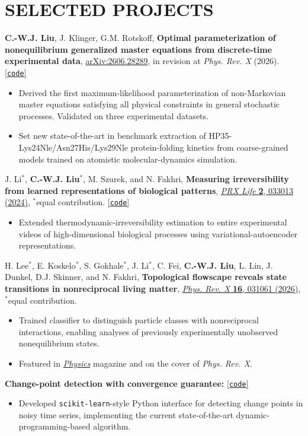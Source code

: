 \documentclass[11pt,letterpaper]{article}
\newcommand{\publication}[1]{#1\par}
\newcommand{\projectsep}{\par\vspace{2pt}}
\begin{document}
\section{SELECTED PROJECTS}
\publication{\textbf{C.-W.J. Liu}, J. Klinger, G.M. Rotskoff, \textbf{Optimal parameterization of nonequilibrium generalized master equations from discrete-time experimental data}, \href{https://doi.org/10.48550/arXiv.2606.28289}{arXiv:2606.28289}, in revision at \textit{Phys. Rev. X} (2026). \href{https://github.com/rotskoff-group/GMEx}{[\texttt{code}]}}
\begin{itemize}
\item Derived the first maximum-likelihood parameterization of non-Markovian master equations satisfying all physical constraints in general stochastic processes.
Validated on three experimental datasets.
\item Set new state-of-the-art in benchmark extraction of HP35-Lys24Nle/Asn27His/Lys29Nle protein-folding kinetics from coarse-grained models trained on atomistic molecular-dynamics simulation.
\end{itemize}
\projectsep
\publication{J. Li$^*$, \textbf{C.-W.J. Liu}$^*$, M. Szurek, and N. Fakhri, \textbf{Measuring irreversibility from learned representations of biological patterns}, \href{https://doi.org/10.1103/PRXLife.2.033013}{\textit{PRX Life} \textbf{2}, 033013 (2024)}, $^*$equal contribution. \href{https://github.com/cjoshliu/irreversibility-from-representations}{[\texttt{code}]}}
\begin{itemize}
\item Extended thermodynamic-irreversibility estimation to entire experimental videos of high-dimensional biological processes using variational-autoencoder representations.
\end{itemize}
\projectsep
\publication{H. Lee$^*$, E. Koskelo$^*$, S. Gokhale$^*$, J. Li$^*$, C. Fei, \textbf{C.-W.J. Liu}, L. Lin, J. Dunkel, D.J. Skinner, and N. Fakhri, \textbf{Topological flowscape reveals state transitions in nonreciprocal living matter}, \href{https://doi.org/10.1103/tq6h-f5ws}{\textit{Phys. Rev. X} \textbf{16}, 031061 (2026)}, $^*$equal contribution.}
\begin{itemize}
\item Trained classifier to distinguish particle classes with nonreciprocal interactions, enabling analyses of previously experimentally unobserved nonequilibrium states.
\item Featured in \href{https://physics.aps.org/articles/v19/115}{\textit{Physics}} magazine and on the cover of \textit{Phys. Rev. X}.
\end{itemize}
\projectsep
\textbf{Change-point detection with convergence guarantee:} \href{https://github.com/cjoshliu/py-step-detect}{[\texttt{code}]}\par
\begin{itemize}
\item Developed \texttt{scikit-learn}-style Python interface for detecting change points in noisy time series, implementing the current state-of-the-art dynamic-programming-based algorithm.
\end{itemize}
\end{document}

